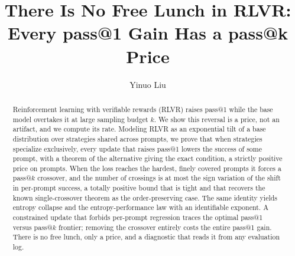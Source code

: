 \documentclass{article}
\title{There Is No Free Lunch in RLVR:\\ Every pass@1 Gain Has a pass@k Price}
\author{Yinuo Liu}
\date{}
\theoremstyle{plain}
\theoremstyle{definition}
\begin{document}
\maketitle
\begin{abstract}
Reinforcement learning with verifiable rewards (RLVR) raises pass@1 while the
base model overtakes it at large sampling budget $k$. We show this reversal is a
price, not an artifact, and we compute its rate. Modeling RLVR as an exponential
tilt of a base distribution over strategies shared across prompts, we prove that
when strategies specialize exclusively, every update that raises pass@1 lowers the
success of some prompt, with a theorem of the alternative giving the exact
condition, a strictly positive price on prompts. When the loss reaches the hardest, finely covered prompts it forces a
pass@$k$ crossover, and the number of crossings is at most the sign variation of
the shift in per-prompt success, a totally positive bound that is tight and that
recovers the known single-crossover theorem as the order-preserving case. The
same identity yields entropy collapse and the entropy-performance law with an
identifiable exponent. A constrained update that forbids per-prompt regression
traces the optimal pass@1 versus pass@$k$ frontier; removing the crossover
entirely costs the entire pass@1 gain. There is no free lunch, only a price, and
a diagnostic that reads it from any evaluation log.
\end{abstract}









\end{document}
